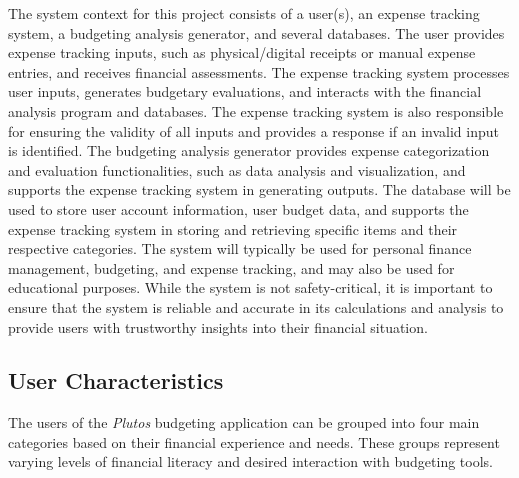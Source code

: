 \documentclass[12pt]{article}
\begin{document}
The system context for this project consists of a user(s), an expense tracking system, 
a budgeting analysis generator, and several databases. The user provides expense 
tracking inputs, such as physical/digital receipts or manual expense entries, and 
receives financial assessments. The expense tracking system processes user inputs, 
generates budgetary evaluations, and interacts with the financial analysis program 
and databases. The expense tracking system is also responsible for ensuring the 
validity of all inputs and provides a response if an invalid input is identified. 
The budgeting analysis generator provides expense categorization and evaluation 
functionalities, such as data analysis and visualization, and supports the expense 
tracking system in generating outputs. The database will be used to store user 
account information, user budget data, and supports the expense tracking system 
in storing and retrieving specific items and their respective categories. 
The system will typically be used for personal finance management, budgeting, 
and expense tracking, and may also be used for educational purposes. While 
the system is not safety-critical, it is important to ensure that the system is 
reliable and accurate in its calculations and analysis to provide users with 
trustworthy insights into their financial situation.

\subsection{User Characteristics} \label{SecUserCharacteristics}

The users of the \textit{Plutos} budgeting application can be grouped into four main categories based on their financial experience and needs. These groups represent varying levels of financial literacy and desired interaction with budgeting tools.
\end{document}
